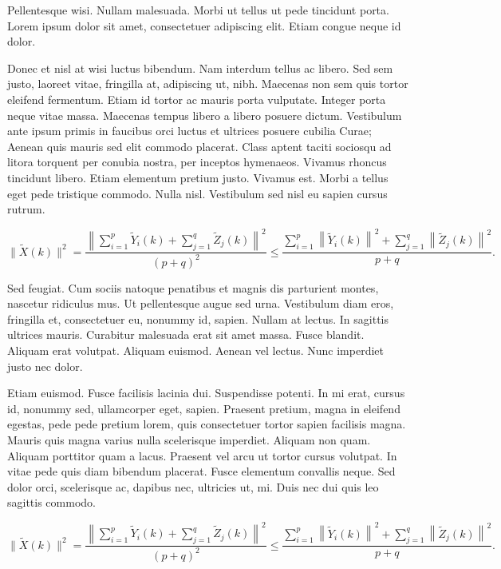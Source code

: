 \documentclass[AMS,STIX2COL]{WileyNJD-v2}
\begin{document}
    Pellentesque wisi. Nullam malesuada. Morbi ut tellus ut pede tincidunt porta. Lorem ipsum dolor sit amet,
    consectetuer adipiscing elit. Etiam congue neque id dolor.

    Donec et nisl at wisi luctus bibendum. Nam interdum tellus ac libero. Sed sem justo, laoreet vitae, fringilla at,
    adipiscing ut, nibh. Maecenas non sem quis tortor eleifend fermentum. Etiam id tortor ac mauris porta vulputate.
    Integer porta neque vitae massa. Maecenas tempus libero a libero posuere dictum. Vestibulum ante ipsum primis in
    faucibus orci luctus et ultrices posuere cubilia Curae; Aenean quis mauris sed elit commodo placerat. Class aptent
    taciti sociosqu ad litora torquent per conubia nostra, per inceptos hymenaeos. Vivamus rhoncus tincidunt libero.
    Etiam elementum pretium justo. Vivamus est. Morbi a tellus eget pede tristique commodo. Nulla nisl. Vestibulum
    sed nisl eu sapien cursus rutrum.

    \begin{equation}
        \label{eq23}
        \|\tilde{X}(k)\|^2
        =\frac{\left\|\sum\limits_{i=1}^{p}\tilde{Y}_i(k)+\sum\limits_{j=1}^{q}\tilde{Z}_j(k) \right\|^2}{(p+q)^2}
        \leq\frac{\sum\limits_{i=1}^{p}\left\|\tilde{Y}_i(k)\right\|^2+\sum\limits_{j=1}^{q}\left\|\tilde{Z}_j(k)\right\|^2 }{p+q}.
    \end{equation}

    Sed feugiat. Cum sociis natoque penatibus et magnis dis parturient montes, nascetur ridiculus mus. Ut pellentesque
    augue sed urna. Vestibulum diam eros, fringilla et, consectetuer eu, nonummy id, sapien. Nullam at lectus. In sagittis
    ultrices mauris. Curabitur malesuada erat sit amet massa. Fusce blandit. Aliquam erat volutpat. Aliquam euismod.
    Aenean vel lectus. Nunc imperdiet justo nec dolor.

    Etiam euismod. Fusce facilisis lacinia dui. Suspendisse potenti. In mi erat, cursus id, nonummy sed, ullamcorper
    eget, sapien. Praesent pretium, magna in eleifend egestas, pede pede pretium lorem, quis consectetuer tortor sapien
    facilisis magna. Mauris quis magna varius nulla scelerisque imperdiet. Aliquam non quam. Aliquam porttitor quam
    a lacus. Praesent vel arcu ut tortor cursus volutpat. In vitae pede quis diam bibendum placerat. Fusce elementum
    convallis neque. Sed dolor orci, scelerisque ac, dapibus nec, ultricies ut, mi. Duis nec dui quis leo sagittis commodo.

    \begin{equation}
        \label{eq24}
        \|\tilde{X}(k)\|^2
        =\frac{\left\|\sum\limits_{i=1}^{p}\tilde{Y}_i(k)+\sum\limits_{j=1}^{q}\tilde{Z}_j(k) \right\|^2}{(p+q)^2}
        \leq\frac{\sum\limits_{i=1}^{p}\left\|\tilde{Y}_i(k)\right\|^2+\sum\limits_{j=1}^{q}\left\|\tilde{Z}_j(k)\right\|^2 }{p+q}.
    \end{equation}
\end{document}
